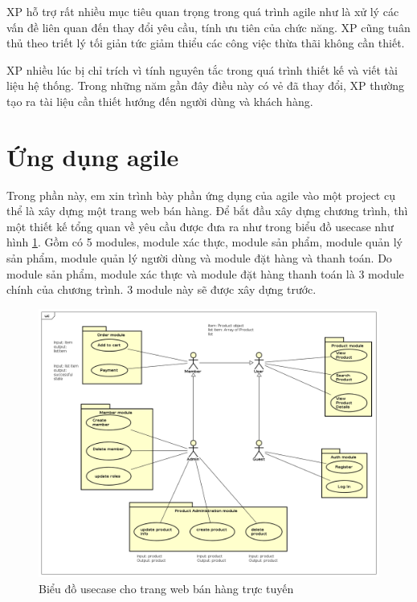 \documentclass{article}
\begin{document}
	XP hỗ trợ rất nhiều mục tiêu quan trọng trong quá trình agile như là xử lý các vấn đề liên quan đến thay đổi yêu cầu, tính ưu tiên của chức năng. XP cũng tuân thủ theo triết lý tối giản tức giảm thiểu các công việc thừa thãi không cần thiết.
	
	XP nhiều lúc bị chỉ trích vì tính nguyên tắc trong quá trình thiết kế và viết tài liệu hệ thống. Trong những năm gần đây điều này có vẻ đã thay đổi, XP thường tạo ra tài liệu cần thiết hướng đến người dùng và khách hàng. 
	
\section{ Ứng dụng agile}

Trong phần này, em xin trình bày phần ứng dụng của agile vào một project cụ thể là xây dựng một trang web bán hàng. Để bắt đầu xây dựng chương trình, thì một thiết kế tổng quan về yêu cầu được đưa ra như trong biểu đồ usecase như hình \ref{fig:usecase}. Gồm có 5 modules, module xác thực, module sản phẩm, module quản lý sản phẩm, module quản lý người dùng và module đặt hàng và thanh toán. Do module sản phẩm, module xác thực và module đặt hàng thanh toán là 3 module chính của chương trình. 3 module này sẽ được xây dựng trước. 

\begin{figure}[h]
	\centering
	\includegraphics[scale=0.3]{figures/usecase.png}
	\caption{Biểu đồ usecase cho trang web bán hàng trực tuyến}
	\label{fig:usecase}
\end{figure}
\end{document}
